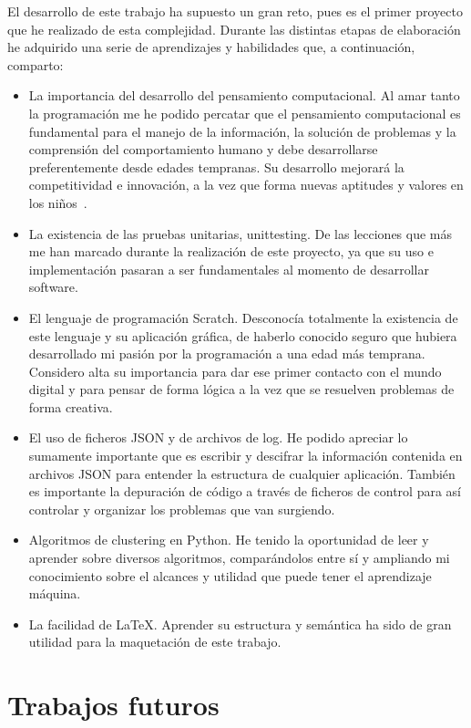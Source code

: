\documentclass[a4paper, 12pt]{book}
\begin{document}
El desarrollo de este trabajo ha supuesto un gran reto, pues es el primer proyecto que he realizado de esta complejidad. Durante las distintas etapas de elaboración he adquirido una serie de aprendizajes y habilidades que, a continuación, comparto:

\begin{itemize}
\item La importancia del desarrollo del pensamiento computacional. Al amar tanto la programación me he podido percatar que el pensamiento computacional es fundamental para el manejo de la información, la solución de problemas y la comprensión del comportamiento humano y debe desarrollarse preferentemente desde edades tempranas. Su desarrollo mejorará la competitividad e innovación, a la vez que forma nuevas aptitudes y valores en los niños~\cite{wing_socialissues}.
\item La existencia de las pruebas unitarias, unittesting. De las lecciones que más me han marcado durante la realización de este proyecto, ya que su uso e implementación pasaran a ser fundamentales al momento de desarrollar software.
\item El lenguaje de programación Scratch. Desconocía totalmente la existencia de este lenguaje y su aplicación gráfica, de haberlo conocido seguro que hubiera desarrollado mi pasión por la programación a una edad más temprana. Considero alta su importancia para dar ese primer contacto con el mundo digital y para pensar de forma lógica a la vez que se resuelven problemas de forma creativa.
\item El uso de ficheros JSON y de archivos de log. He podido apreciar lo sumamente importante que es escribir y descifrar la información contenida en archivos JSON para entender la estructura de cualquier aplicación. También es importante la depuración de código a través de ficheros de control para así controlar y organizar los problemas que van surgiendo.  
\item Algoritmos de clustering en Python. He tenido la oportunidad de leer y aprender sobre diversos algoritmos, comparándolos entre sí y ampliando mi conocimiento sobre el alcances y utilidad que puede tener el aprendizaje máquina. 
\item La facilidad de \LaTeX. Aprender su estructura y semántica ha sido de gran utilidad para la maquetación de este trabajo.
\end{itemize}


\section{Trabajos futuros}
\label{sec:trabajos_futuros}
\end{document}
